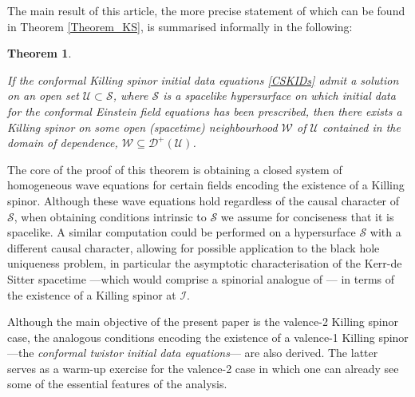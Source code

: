 \documentclass[10pt,a4paper]{article}
\theoremstyle{plain}
\newtheorem*{main}{Theorem}
\def\bmg{{\bm g}}
\begin{document}
The main result of this article, the more precise statement of which
can be found in Theorem \ref{Theorem_KS}, is summarised informally
in the following:

\begin{main}\label{TheoremSummary}

If the conformal Killing spinor initial data equations
\eqref{CSKIDs} admit a solution on an open set $\mathcal{U}\subset
\mathcal{S}$, where $\mathcal{S}$ is a spacelike hypersurface on which
initial data for the conformal Einstein field equations has been
prescribed, then there exists a Killing spinor on some open (spacetime) neighbourhood $\mathcal{W}$ of $\mathcal{U}$ contained in the
domain of dependence, $\mathcal{W}\subseteq\mathcal{D}^+(\mathcal{U})$.
\end{main}

   The core of the proof of this theorem is
   obtaining a closed system of homogeneous wave equations for certain fields
   encoding the existence of a Killing spinor. Although these wave
   equations hold regardless of the causal character of $\mathcal{S}$,
   when obtaining conditions intrinsic to $\mathcal{S}$ we assume for conciseness
   that it is spacelike.  A similar
   computation could be performed on a hypersurface $\mathcal{S}$ with
   a different causal character, allowing for possible application to
the black hole uniqueness problem, in particular the asymptotic characterisation
   of the Kerr-de Sitter spacetime ---which would comprise a spinorial analogue of \cite{MarPaeSenSim16}---
   in terms of the existence of a Killing spinor at $\mathscr{I}$. 
\medskip 

    Although the main objective of the present paper is the valence-2 Killing spinor case, the analogous conditions encoding the
    existence of a valence-1 Killing spinor ---the \emph{conformal
  twistor initial data equations}--- are also derived.  The
    latter serves as a warm-up exercise for the valence-2 case in which one can already see some of the essential features of the analysis.
\end{document}
